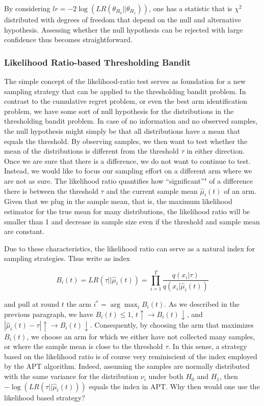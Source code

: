 \documentclass[12pt,]{article}
\begin{document}
By considering \(lr = -2\log(LR(\theta_{H_0}|| \theta_{H_1}))\), one has
a statistic that is \(\chi^2\) distributed with degrees of freedom that
depend on the null and alternative hypothesis. Assessing whether the
null hypothesis can be rejected with large confidence thus becomes
straightforward.

\subsubsection{Likelihood Ratio-based Thresholding
Bandit}\label{likelihood-ratio-based-thresholding-bandit}

The simple concept of the likelihood-ratio test serves as foundation for
a new sampling strategy that can be applied to the thresholding bandit
problem. In contrast to the cumulative regret problem, or even the best
arm identification problem, we have some sort of null hypothesis for the
distributions in the thresholding bandit problem. In case of no
information and no observed samples, the null hypothesis might simply be
that all distributions have a mean that equals the threshold. By
observing samples, we then want to test whether the mean of the
distributions is different from the threshold \(\tau\) in either
direction. Once we are sure that there is a difference, we do not want
to continue to test. Instead, we would like to focus our sampling effort
on a different arm where we are not as sure. The likelihood ratio
quantifies how ``significant''" of a difference there is between the
threshold \(\tau\) and the current sample mean \(\hat{\mu}_i(t)\) of an
arm. Given that we plug in the sample mean, that is, the maximum
likelihood estimator for the true mean for many distributions, the
likelihood ratio will be smaller than 1 and decrease in sample size even
if the threshold and sample mean are constant.

Due to these characteristics, the likelihood ratio can serve as a
natural index for sampling strategies. Thus write as index

\[
B_i(t) = LR(\tau|| \hat{\mu}_i(t)) = \prod_{i=1}^T\frac{q(x_i|\tau)}{ q(x_i|\hat{\mu}_i(t))}
\]

and pull at round \(t\) the arm \(i^* = \arg \max_i B_i(t)\). As we
described in the previous paragraph, we have \(B_i(t) \leq 1\),
\(t \uparrow \rightarrow B_i(t) \downarrow\), and
\(|\hat{\mu}_i(t) - \tau| \uparrow \rightarrow B_i(t) \downarrow\).
Consequently, by choosing the arm that maximizes \(B_i(t)\), we choose
an arm for which we either have not collected many samples, or where the
sample mean is close to the threshold \(\tau\). In this sense, a
strategy based on the likelihood ratio is of course very reminiscient of
the index employed by the APT algorithm. Indeed, assuming the samples
are normally distributed with the same variance for the distribution
\(\nu_i\) under both \(H_0\) and \(H_1\), then
\(-\log(LR(\tau||\hat{\mu}_i(t)))\) equals the index in APT. Why then
would one use the likelihood based strategy?
\end{document}
